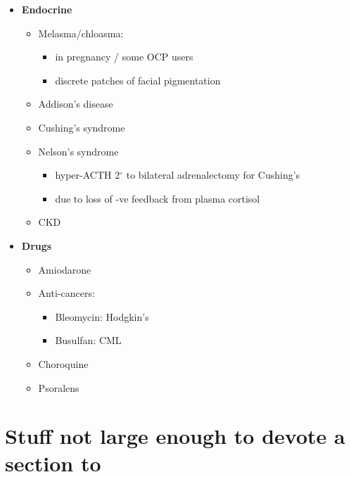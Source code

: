 \documentclass[
  12pt,
]{memoir}
\providecommand{\tightlist}{%
  \setlength{\itemsep}{0pt}\setlength{\parskip}{0pt}}
\begin{document}
\begin{itemize}
\tightlist
\item
  \textbf{Endocrine}

  \begin{itemize}
  \tightlist
  \item
    Melasma/chloasma:

    \begin{itemize}
    \tightlist
    \item
      in pregnancy / some OCP users
    \item
      discrete patches of facial pigmentation
    \end{itemize}
  \item
    Addison's disease
  \item
    Cushing's syndrome
  \item
    Nelson's syndrome

    \begin{itemize}
    \tightlist
    \item
      hyper-ACTH 2\(^\circ\) to bilateral adrenalectomy for Cushing's
    \item
      due to loss of -ve feedback from plasma cortisol
    \end{itemize}
  \item
    CKD
  \end{itemize}
\item
  \textbf{Drugs}

  \begin{itemize}
  \tightlist
  \item
    Amiodarone
  \item
    Anti-cancers:

    \begin{itemize}
    \tightlist
    \item
      Bleomycin: Hodgkin's
    \item
      Busulfan: CML
    \end{itemize}
  \item
    Choroquine
  \item
    Psoralens
  \end{itemize}
\end{itemize}

\hypertarget{stuff-not-large-enough-to-devote-a-section-to}{%
\section{Stuff not large enough to devote a section
to}\label{stuff-not-large-enough-to-devote-a-section-to}}
\end{document}
